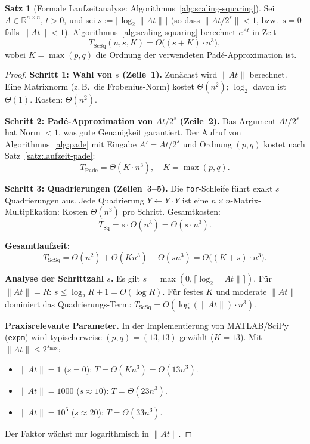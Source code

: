 \documentclass[a4paper,12pt]{report}
\theoremstyle{definition}
\newtheorem{satz}{Satz}
\begin{document}
	\begin{satz}[Formale Laufzeitanalyse: Algorithmus~\ref{alg:scaling-squaring}]
		\label{satz:laufzeit-scaling-squaring}
		Sei $A \in \mathbb{R}^{n \times n}$, $t > 0$, und sei $s := \lceil \log_2 \|At\| \rceil$ (so dass $\|At/2^s\| < 1$, bzw.\ $s = 0$ falls $\|At\| < 1$). Algorithmus~\ref{alg:scaling-squaring} berechnet $e^{At}$ in Zeit
		\[
			T_{\mathrm{ScSq}}(n, s, K) = \Theta\bigl((s + K) \cdot n^3\bigr),
		\]
		wobei $K = \max(p,q)$ die Ordnung der verwendeten Padé-Approximation ist.
	\end{satz}
	\begin{proof}
		\textbf{Schritt 1: Wahl von $s$ (Zeile~1).}
		Zunächst wird $\|At\|$ berechnet. Eine Matrixnorm (z.\,B.\ die Frobenius-Norm) kostet $\Theta(n^2)$; $\log_2$ davon ist $\Theta(1)$. Kosten: $\Theta(n^2)$.

		\textbf{Schritt 2: Padé-Approximation von $At/2^s$ (Zeile~2).}
		Das Argument $At/2^s$ hat Norm $< 1$, was gute Genauigkeit garantiert. Der Aufruf von Algorith\-mus~\ref{alg:pade} mit Eingabe $A' = At/2^s$ und Ordnung $(p,q)$ kostet nach Satz~\ref{satz:laufzeit-pade}:
		\[
			T_{\mathrm{Pad\acute{e}}} = \Theta(K \cdot n^3), \quad K = \max(p,q).
		\]

		\textbf{Schritt 3: Quadrierungen (Zeilen~3--5).} Die \texttt{for}-Schleife führt exakt $s$ Quadrierungen aus. Jede Quadrierung $Y \gets Y \cdot Y$ ist eine $n{\times}n$-Matrix-Mul\-tiplikation: Kosten $\Theta(n^3)$ pro Schritt. Gesamtkosten:
		\[
			T_{\mathrm{Sq}} = s \cdot \Theta(n^3) = \Theta(s \cdot n^3).
		\]

		\textbf{Gesamtlaufzeit:}
		\[
			T_{\mathrm{ScSq}} = \Theta(n^2) + \Theta(K n^3) + \Theta(s n^3) = \Theta\bigl((K + s) \cdot n^3\bigr).
		\]

		\textbf{Analyse der Schrittzahl $s$.} Es gilt $s = \max(0, \lceil \log_2 \|At\| \rceil)$. Für $\|At\| = R$:
		$s \leq \log_2 R + 1 = O(\log R)$.
		Für festes $K$ und moderate $\|At\|$ dominiert das Quadrierungs-Term: $T_{\mathrm{ScSq}} = O(\log(\|At\|) \cdot n^3)$.

		\textbf{Praxisrelevante Parameter.} In der Implementierung von MATLAB/SciPy (\texttt{expm}) wird typischerweise $(p,q) = (13,13)$ gewählt ($K = 13$). Mit $\|At\| \leq 2^{s_{\max}}$:
		\begin{itemize}
			\item $\|At\| = 1$ ($s = 0$): $T = \Theta(K n^3) = \Theta(13 n^3)$.
			\item $\|At\| = 1000$ ($s \approx 10$): $T = \Theta(23 n^3)$.
			\item $\|At\| = 10^6$ ($s \approx 20$): $T = \Theta(33 n^3)$.
		\end{itemize}
		Der Faktor wächst nur logarithmisch in $\|At\|$.


\end{proof}
\end{document}
